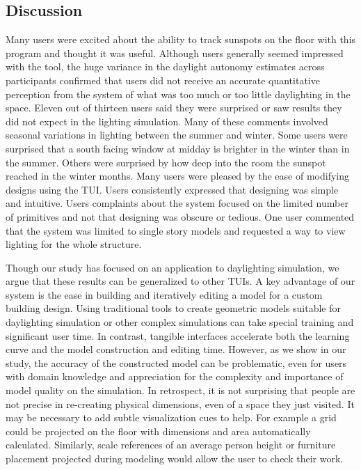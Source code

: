\subsection{Discussion}

Many users were excited about the ability to track sunspots on the
floor with this program and thought it was useful.  Although users
generally seemed impressed with the tool, the huge variance in the
daylight autonomy estimates across participants confirmed that users
did not receive an accurate quantitative perception from the system of
what was too much or too little daylighting in the space.
%
Eleven out of thirteen users said they were surprised or saw results
they did not expect in the lighting simulation.  Many of these
comments involved seasonal variations in lighting between the summer
and winter.  Some users were surprised that a south facing window at
midday is brighter in the winter than in the summer.  Others were
surprised by how deep into the room the sunspot reached in the winter
months.
%
Many users were pleased by the ease of modifying designs using the
TUI.  Users consistently expressed that designing was simple and
intuitive.  Users complaints about the system focused on the limited
number of primitives and not that designing was obscure or tedious.
One user commented that the system was limited to single story models
and requested a way to view lighting for the whole structure.


Though our study has focused on an application to daylighting
simulation, we argue that these results can be generalized to other
TUIs.  A key advantage of our system is the ease in building and
iteratively editing a model for a custom building design.  Using
traditional tools to create geometric models suitable for daylighting
simulation or other complex simulations can take special training and
significant user time.  In contrast, tangible interfaces accelerate
both the learning curve and the model construction and editing time.
However, as we show in our study, the accuracy of the constructed
model can be problematic, even for users with domain knowledge and
appreciation for the complexity and importance of model quality on the
simulation.  
%
In retrospect, it is not surprising that people are not precise in
re-creating physical dimensions, even of a space they just visited.
It may be necessary to add subtle visualization cues to help.  For
example a grid could be projected on the floor with dimensions and
area automatically calculated.  Similarly, scale references of an
average person height or furniture placement projected during modeling
would allow the user to check their work.

